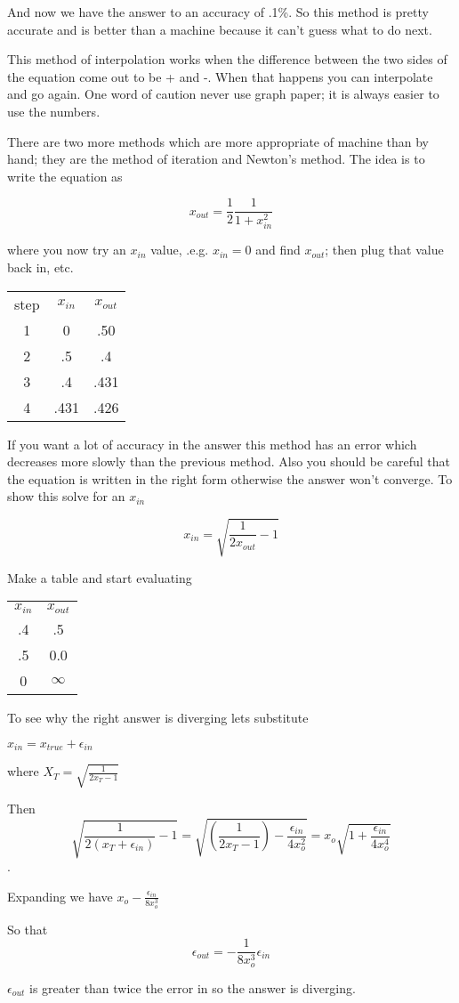 \documentclass[a4paper,10pt]{article}
\begin{document}
And now we have the answer to an accuracy of .1\%. So this method is pretty accurate and is better than a machine because
it can't guess what to do next.

This method of interpolation works when the difference between the two sides of the equation come out to be + and -. 
When that happens you can interpolate and go again.  One word of caution never use graph paper; it is always easier to use the
numbers.

There are two more methods which are more appropriate of machine than by hand; they are the method of iteration and Newton's method.
The idea is to write the equation as
\begin{center}
 $$x_{out}=\frac{1}{2}\frac{1}{1+x^2_{in}}$$
\end{center}

where you now try an $x_{in}$ value, .e.g. $x_{in}=0$ and find $x_{out}$; then plug that value back in, etc.

\begin{tabular}{c c c}
step & $x_{in}$ & $x_{out}$\\
1 & 0 & .50\\
2 & .5 & .4\\
3 & .4 & .431\\
4 & .431 & .426
\end{tabular}

If you want a lot of accuracy in the answer this method has an error which decreases more slowly than the previous method. 
Also you should be careful that the equation is written in the right form otherwise the answer won't converge. To show this solve
for an $x_{in}$ 
\begin{center}
 $$x_{in}=\sqrt{\frac{1}{2x_{out}}-1}$$
\end{center}

Make a table and start evaluating
\begin{center}
\begin{tabular}{c c}
$x_{in}$ & $x_{out}$\\
.4 & .5\\
.5 & 0.0\\
0 & $\infty$

\end{tabular}
\end{center}

To see why the right answer is diverging lets substitute \begin{center}$x_{in}=x_{true}+\epsilon_{in}$\end{center}
where $X_T=\sqrt{\frac{1}{2x_T-1}}$

Then $$\sqrt{\frac{1}{2(x_T+\epsilon_{in})}-1}=\sqrt{(\frac{1}{2x_T-1})-\frac{\epsilon_{in}}{4x_o^2}}=x_o\sqrt{1+\frac{\epsilon_{in}}{4x_o^4}}$$.

Expanding we have $x_o-\frac{\epsilon_{in}}{8x_o^3}$

So that $$\epsilon_{out}=-\frac{1}{8x_o^3}\epsilon_{in}$$

$\epsilon_{out}$ is greater than twice the error in so the answer is diverging. 
\end{document}
